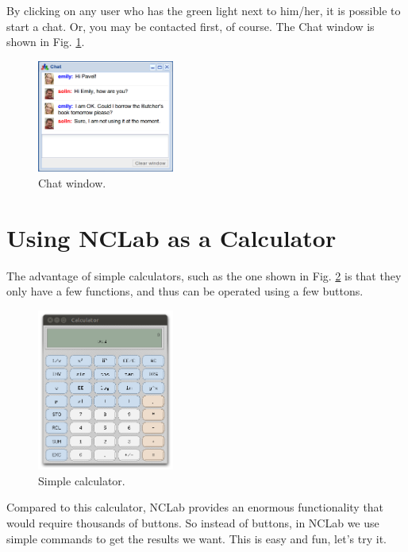 \documentclass[article,A4,12pt]{llncs}
\begin{document}
\noindent
By clicking on any user who has the green light next to him/her,
it is possible to start a chat. Or, you may be contacted first, 
of course. The Chat window is shown in Fig. \ref{fig:chat}.

\begin{figure}[!ht]
\begin{center}
\includegraphics[width=0.4\textwidth]{img/chat.png}
\end{center}
\caption{Chat window.}
\label{fig:chat}
\end{figure}


\section{Using NCLab as a Calculator}

The advantage of simple calculators, such as the one shown in Fig. \ref{fig:xcalc}
is that they only have a few functions, and thus can be operated using a few buttons.

\begin{figure}[!ht]
\begin{center}
\includegraphics[width=0.4\textwidth]{img/xcalc.png}
\end{center}
\caption{Simple calculator.}
\label{fig:xcalc}
\end{figure}
\noindent
Compared to this calculator, NCLab provides an enormous functionality 
that would require thousands of buttons. So instead of buttons,
in NCLab we use simple commands to get the results we want. This is 
easy and fun, let's try it.
\end{document}
